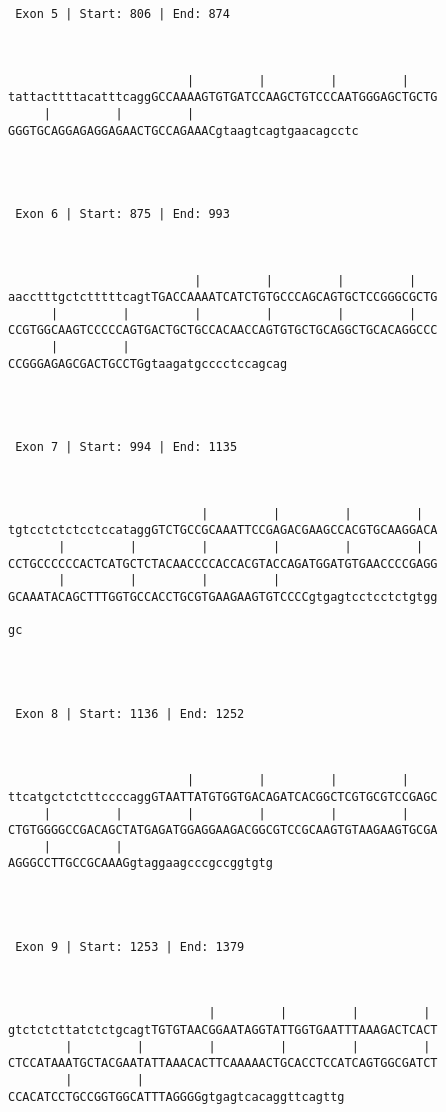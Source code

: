 \documentclass{article}
\begin{document}
\begin{Verbatim}
 Exon 5 | Start: 806 | End: 874 



                         |         |         |         |    
tattacttttacatttcaggGCCAAAAGTGTGATCCAAGCTGTCCCAATGGGAGCTGCTG
     |         |         |                       
GGGTGCAGGAGAGGAGAACTGCCAGAAACgtaagtcagtgaacagcctc




 Exon 6 | Start: 875 | End: 993 



                          |         |         |         |   
aacctttgctctttttcagtTGACCAAAATCATCTGTGCCCAGCAGTGCTCCGGGCGCTG
      |         |         |         |         |         |   
CCGTGGCAAGTCCCCCAGTGACTGCTGCCACAACCAGTGTGCTGCAGGCTGCACAGGCCC
      |         |                      
CCGGGAGAGCGACTGCCTGgtaagatgcccctccagcag




 Exon 7 | Start: 994 | End: 1135 



                           |         |         |         |  
tgtcctctctcctccataggGTCTGCCGCAAATTCCGAGACGAAGCCACGTGCAAGGACA
       |         |         |         |         |         |  
CCTGCCCCCCACTCATGCTCTACAACCCCACCACGTACCAGATGGATGTGAACCCCGAGG
       |         |         |         |                      
GCAAATACAGCTTTGGTGCCACCTGCGTGAAGAAGTGTCCCCgtgagtcctcctctgtgg
  
gc




 Exon 8 | Start: 1136 | End: 1252 



                         |         |         |         |    
ttcatgctctcttccccaggGTAATTATGTGGTGACAGATCACGGCTCGTGCGTCCGAGC
     |         |         |         |         |         |    
CTGTGGGGCCGACAGCTATGAGATGGAGGAAGACGGCGTCCGCAAGTGTAAGAAGTGCGA
     |         |                     
AGGGCCTTGCCGCAAAGgtaggaagcccgccggtgtg




 Exon 9 | Start: 1253 | End: 1379 



                            |         |         |         | 
gtctctcttatctctgcagtTGTGTAACGGAATAGGTATTGGTGAATTTAAAGACTCACT
        |         |         |         |         |         | 
CTCCATAAATGCTACGAATATTAAACACTTCAAAAACTGCACCTCCATCAGTGGCGATCT
        |         |                            
CCACATCCTGCCGGTGGCATTTAGGGGgtgagtcacaggttcagttg





\end{Verbatim}
\end{document}

